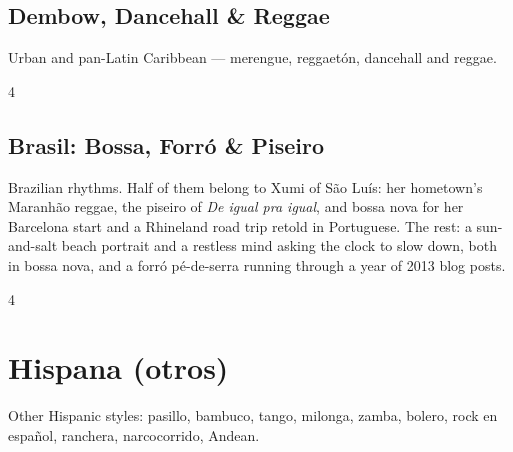 \documentclass[a4paper,landscape]{memoir}
\begin{document}
\chapter{Dembow, Dancehall \& Reggae}
Urban and pan-Latin Caribbean — merengue, reggaetón, dancehall and reggae.
\clearpage\begin{multicols*}{4}
\end{multicols*}

\chapter{Brasil: Bossa, Forró \& Piseiro}
Brazilian rhythms. Half of them belong to Xumi of São Luís: her hometown's Maranhão reggae, the piseiro of \emph{De igual pra igual}, and bossa nova for her Barcelona start and a Rhineland road trip retold in Portuguese. The rest: a sun-and-salt beach portrait and a restless mind asking the clock to slow down, both in bossa nova, and a forró pé-de-serra running through a year of 2013 blog posts.
\clearpage\begin{multicols*}{4}
\end{multicols*}

\part{Hispana (otros)}
Other Hispanic styles: pasillo, bambuco, tango, milonga, zamba, bolero, rock en espa\~nol, ranchera, narcocorrido, Andean.
\end{document}
